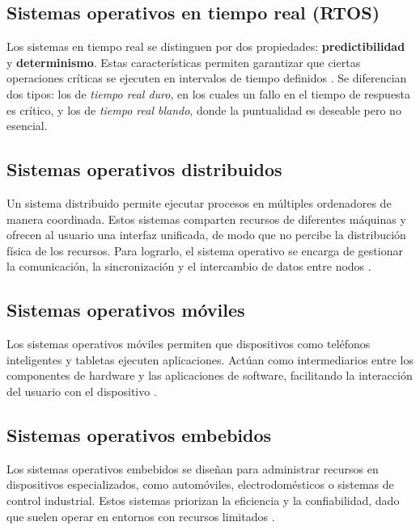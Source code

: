\subsection{Sistemas operativos en tiempo real (RTOS)}

Los sistemas en tiempo real se distinguen por dos propiedades: \textbf{predictibilidad} y \textbf{determinismo}. Estas características permiten garantizar que ciertas operaciones críticas se ejecuten en intervalos de tiempo definidos \parencite{windriver_rtos}. Se diferencian dos tipos: los de \textit{tiempo real duro}, en los cuales un fallo en el tiempo de respuesta es crítico, y los de \textit{tiempo real blando}, donde la puntualidad es deseable pero no esencial.

\subsection{Sistemas operativos distribuidos}

Un sistema distribuido permite ejecutar procesos en múltiples ordenadores de manera coordinada. Estos sistemas comparten recursos de diferentes máquinas y ofrecen al usuario una interfaz unificada, de modo que no percibe la distribución física de los recursos. Para lograrlo, el sistema operativo se encarga de gestionar la comunicación, la sincronización y el intercambio de datos entre nodos \textcite{ibm_que_es_so}.

\subsection{Sistemas operativos móviles}

Los sistemas operativos móviles permiten que dispositivos como teléfonos inteligentes y tabletas ejecuten aplicaciones. Actúan como intermediarios entre los componentes de hardware y las aplicaciones de software, facilitando la interacción del usuario con el dispositivo \parencite{techtarget_os_definition}.

\subsection{Sistemas operativos embebidos}

Los sistemas operativos embebidos se diseñan para administrar recursos en dispositivos especializados, como automóviles, electrodomésticos o sistemas de control industrial. Estos sistemas priorizan la eficiencia y la confiabilidad, dado que suelen operar en entornos con recursos limitados \textcite{ibm_que_es_so}.

